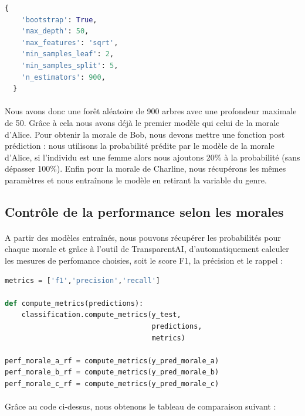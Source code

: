 \documentclass[10pt, french, a4paper]{report}
\begin{document}
\begin{lstlisting}[language=python]
  {
    'bootstrap': True,
    'max_depth': 50,
    'max_features': 'sqrt',
    'min_samples_leaf': 2,
    'min_samples_split': 5,
    'n_estimators': 900,
  }
\end{lstlisting}

\paragraph{}
Nous avons donc une forêt aléatoire de 900 arbres avec une profondeur maximale de 50. Grâce à cela nous avons déjà le premier modèle qui celui de la morale d'Alice. Pour obtenir la morale de Bob, nous devons mettre une fonction post prédiction : nous utilisons la probabilité prédite par le modèle de la morale d'Alice, si l'individu est une femme alors nous ajoutons 20\% à la probabilité (sans dépasser 100\%). Enfin pour la morale de Charline, nous récupérons les mêmes paramètres et nous entraînons le modèle en retirant la variable du genre.

\subsection{Contrôle de la performance selon les morales}

\paragraph{}
A partir des modèles entraînés, nous pouvons récupérer les probabilités pour chaque morale et grâce à l'outil de TransparentAI, d'automatiquement calculer les mesures de perfomance choisies, soit le score F1, la précision et le rappel :


\begin{lstlisting}[language=python]
metrics = ['f1','precision','recall']

def compute_metrics(predictions):
    classification.compute_metrics(y_test, 
                                   predictions, 
                                   metrics)

perf_morale_a_rf = compute_metrics(y_pred_morale_a)
perf_morale_b_rf = compute_metrics(y_pred_morale_b)
perf_morale_c_rf = compute_metrics(y_pred_morale_c)
\end{lstlisting}

\paragraph{}
Grâce au code ci-dessus, nous obtenons le tableau de comparaison suivant : 
\end{document}
